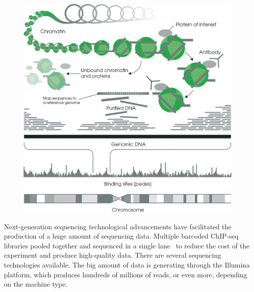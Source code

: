 \begin{figure}[b!]
\centering
\includegraphics[width=\textwidth]{../img/chip.jpeg}
\label{fig:graph_classes}
\end{figure}

Next-generation sequencing technological advancements have facilitated the production of a huge amount of sequencing data. 
Multiple barcoded ChIP-seq libraries pooled together and sequenced in a single lane~\cite{craig2008identification} to reduce the cost of the experiment and produce high-quality data.
There are several sequencing technologies available. 
The big amount of data is generating through the Illumina platform, which produces hundreds of millions of reads, or even more, depending on the machine type.


